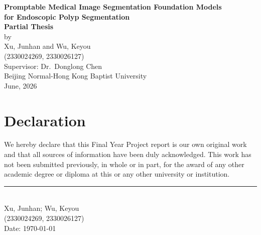 \documentclass[11pt,a4paper,oneside]{report}
\begin{document}
\setcounter{page}{1}

\begin{titlepage}
    \begin{center}
        \vspace*{1.5cm}

        {\Large\textbf{Promptable Medical Image Segmentation Foundation Models}}\\[0.2cm]
        {\Large\textbf{for Endoscopic Polyp Segmentation}}\\[1.2cm]

        {\Large\textbf{Partial Thesis}}\\[1.6cm]

        {\large by}\\[0.8cm]

        {\large Xu, Junhan and Wu, Keyou}\\[0.3cm]
        {\large (2330024269, 2330026127)}\\[1.8cm]

        {\large Supervisor: Dr.\ Donglong Chen}\\[2.2cm]

        {\large Beijing Normal-Hong Kong Baptist University}\\[2.0cm]

        {\large June, 2026}

        \vfill
    \end{center}
\end{titlepage}

\chapter*{Declaration}
\thispagestyle{plain}

We hereby declare that this Final Year Project report is our own original work
and that all sources of information have been duly acknowledged. This work
has not been submitted previously, in whole or in part, for the award of any
other academic degree or diploma at this or any other university or
institution.

\vspace{2cm}
\begin{flushright}
    \rule{6cm}{0.5pt}\\
    Xu, Junhan; Wu, Keyou\\
    (2330024269, 2330026127)\\
    Date: \today
\end{flushright}
\end{document}
